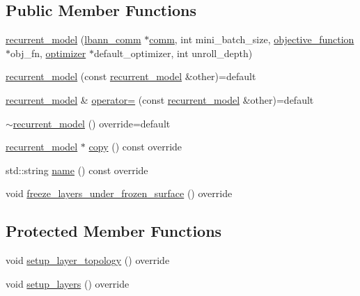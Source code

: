 \subsection*{Public Member Functions}
\begin{DoxyCompactItemize}
\item 
\hyperlink{classlbann_1_1recurrent__model_ac1d3118a1642bd460c9cc9617a592a0b}{recurrent\+\_\+model} (\hyperlink{classlbann_1_1lbann__comm}{lbann\+\_\+comm} $\ast$\hyperlink{file__io_8cpp_ab048c6f9fcbcfaa57ce68b00263dbebe}{comm}, int mini\+\_\+batch\+\_\+size, \hyperlink{classlbann_1_1objective__function}{objective\+\_\+function} $\ast$obj\+\_\+fn, \hyperlink{classlbann_1_1optimizer}{optimizer} $\ast$default\+\_\+optimizer, int unroll\+\_\+depth)
\item 
\hyperlink{classlbann_1_1recurrent__model_adc71cbd387e03acc05a0f2e77aa36457}{recurrent\+\_\+model} (const \hyperlink{classlbann_1_1recurrent__model}{recurrent\+\_\+model} \&other)=default
\item 
\hyperlink{classlbann_1_1recurrent__model}{recurrent\+\_\+model} \& \hyperlink{classlbann_1_1recurrent__model_a32882b23c459e1ce577fc97414521315}{operator=} (const \hyperlink{classlbann_1_1recurrent__model}{recurrent\+\_\+model} \&other)=default
\item 
\hyperlink{classlbann_1_1recurrent__model_aa52648414c397fc4a11ac462c278a4f1}{$\sim$recurrent\+\_\+model} () override=default
\item 
\hyperlink{classlbann_1_1recurrent__model}{recurrent\+\_\+model} $\ast$ \hyperlink{classlbann_1_1recurrent__model_ad184f898241fe026f140db689f129d47}{copy} () const override
\item 
std\+::string \hyperlink{classlbann_1_1recurrent__model_a01b4f6dce63bc2e0545b2bd7603b32b2}{name} () const override
\item 
void \hyperlink{classlbann_1_1recurrent__model_aa4e43de8bf0d11a0f51dedbcf22a73cc}{freeze\+\_\+layers\+\_\+under\+\_\+frozen\+\_\+surface} () override
\end{DoxyCompactItemize}
\subsection*{Protected Member Functions}
\begin{DoxyCompactItemize}
\item 
void \hyperlink{classlbann_1_1recurrent__model_ac89ddfa607e5cb6b940eb389ebbce6f6}{setup\+\_\+layer\+\_\+topology} () override
\item 
void \hyperlink{classlbann_1_1recurrent__model_a712dabb1c1e90f6e268b42f6abaedd93}{setup\+\_\+layers} () override
\end{DoxyCompactItemize}
